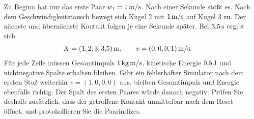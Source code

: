Zu Beginn hat nur das erste Paar \(w_1=1\,\mathrm{m/s}\). Nach einer Sekunde stößt es. Nach dem Geschwindigkeitstausch bewegt sich Kugel 2 mit \(1\,\mathrm{m/s}\) auf Kugel 3 zu. Der nächste und übernächste Kontakt folgen je eine Sekunde später. Bei \(3{,}5\,\mathrm{s}\) ergibt sich
\[
 X=(1,2,3,3{,}5)\,\mathrm{m},\qquad v=(0,0,0,1)\,\mathrm{m/s}.
\]
Für jede Zeile müssen Gesamtimpuls \(1\,\mathrm{kg\,m/s}\), kinetische Energie \(0{,}5\,\mathrm{J}\) und nichtnegative Spalte erhalten bleiben.
Gibt ein fehlerhafter Simulator nach dem ersten Stoß weiterhin \(v=(1,0,0,0)\) aus, bleiben Gesamtimpuls und Energie ebenfalls richtig. Der Spalt des ersten Paares würde danach negativ. Prüfen Sie deshalb zusätzlich, dass der getroffene Kontakt unmittelbar nach dem Reset öffnet, und protokollieren Sie die Paarindizes.

